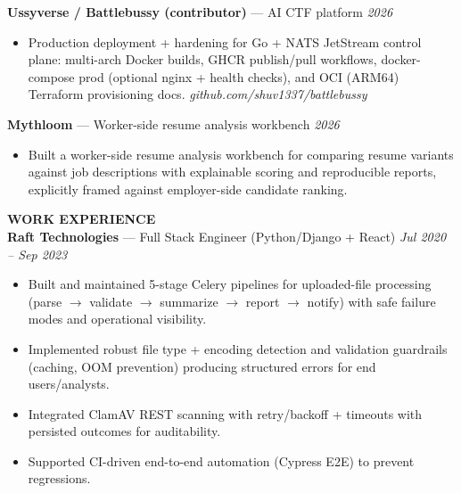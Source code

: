 \documentclass[10pt]{article}
\begin{document}
\textbf{Ussyverse / Battlebussy (contributor)} --- AI CTF platform \hfill \textit{2026}\\
\vspace{-6pt}
\begin{itemize}
  \setlength\itemsep{-2pt}
  \setlength\parskip{0pt}
  \setlength\parsep{0pt}
  \item Production deployment + hardening for Go + NATS JetStream control plane: multi-arch Docker builds, GHCR publish/pull workflows, docker-compose prod (optional nginx + health checks), and OCI (ARM64) Terraform provisioning docs. \textit{github.com/shuv1337/battlebussy}
\end{itemize}

\textbf{Mythloom} --- Worker-side resume analysis workbench \hfill \textit{2026}\\
\vspace{-6pt}
\begin{itemize}
  \setlength\itemsep{-2pt}
  \setlength\parskip{0pt}
  \setlength\parsep{0pt}
  \item Built a worker-side resume analysis workbench for comparing resume variants against job descriptions with explainable scoring and reproducible reports, explicitly framed against employer-side candidate ranking.
\end{itemize}

\vspace{6pt}
\textbf{WORK EXPERIENCE}\\

\textbf{Raft Technologies} --- Full Stack Engineer (Python/Django + React) \hfill \textit{Jul 2020 -- Sep 2023}\\
\vspace{-6pt}
\begin{itemize}
  \setlength\itemsep{-2pt}
  \setlength\parskip{0pt}
  \setlength\parsep{0pt}
  \item Built and maintained 5-stage Celery pipelines for uploaded-file processing (parse $\rightarrow$ validate $\rightarrow$ summarize $\rightarrow$ report $\rightarrow$ notify) with safe failure modes and operational visibility.
  \item Implemented robust file type + encoding detection and validation guardrails (caching, OOM prevention) producing structured errors for end users/analysts.
  \item Integrated ClamAV REST scanning with retry/backoff + timeouts with persisted outcomes for auditability.
  \item Supported CI-driven end-to-end automation (Cypress E2E) to prevent regressions.
\end{itemize}
\end{document}

